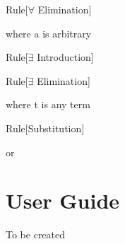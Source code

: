 \begin{namedthm}{Rule}[$\forall$ Elimination]

\begin{bprooftree}
\end{bprooftree}\qquad where a is arbitrary \qquad

\end{namedthm}


\begin{namedthm}{Rule}[$\exists$ Introduction]

\begin{bprooftree}
\end{bprooftree}\qquad

\end{namedthm}

\begin{namedthm}{Rule}[$\exists$ Elimination]

\begin{bprooftree}
\end{bprooftree}\qquad where t is any term

\end{namedthm}

\begin{namedthm}{Rule}[Substitution]

\begin{bprooftree}
\end{bprooftree}\qquad or \qquad
\begin{bprooftree}
\end{bprooftree}

\end{namedthm}

\pagebreak

\section{User Guide}
 \label{appendix:userGuide}
 
To be created

\pagebreak

 
 \label{appendix:surveyCrest}

